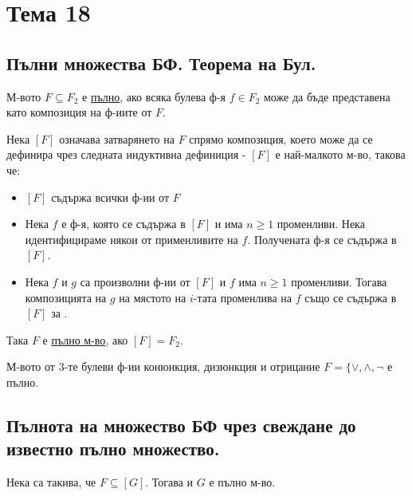 \section{Тема 18}

\subsection*{Пълни множества БФ. Теорема на Бул.}

\begin{definition}[неформално]
    М-вото \(F \subseteq F_2\) е \underline{пълно}, ако всяка булева ф-я \(f \in F_2\) може да бъде 
    представена като композиция на ф-иите от \(F\).
\end{definition}

\begin{definition}[формално]
    Нека \([F]\) означава затварянето на \(F\) спрямо композиция, което може да се дефинира чрез следната 
    индуктивна дефиниция - \([F]\) е най-малкото м-во, такова че:
    \begin{itemize}
        \item \([F]\) съдържа всички ф-ии от \(F\)
        \item Нека \(f\) е ф-я, която се съдържа в \([F]\) и има \(n \ge 1\) променливи. Нека 
        идентифицираме някои от применливите на \(f\). Получената ф-я се съдържа в \([F]\).
        \item Нека \(f\) и \(g\) са произволни ф-ии от \([F]\) и \(f\) има \(n \ge 1\) променливи. Тогава 
        композицията на \(g\) на мястото на \(i\)-тата променлива на \(f\) също се съдържа в \([F]\) за
        .
    \end{itemize}
    Така \(F\) е \underline{пълно м-во}, ако \([F] = F_2\).
\end{definition}

\begin{theorem}[на Бул]
    М-вото от 3-те булеви ф-ии конюнкция, дизюнкция и отрицание \(F = \{\vee, \land, \lnot\) е пълно.
\end{theorem}

\subsection*{Пълнота на множество БФ чрез свеждане до известно пълно множество.}

\begin{lemma}
    Нека  са такива, че \(F \subseteq [G]\). Тогава \mexpr{[F] \subseteq [G]} и 
    \(G\) е пълно м-во.
\end{lemma}

